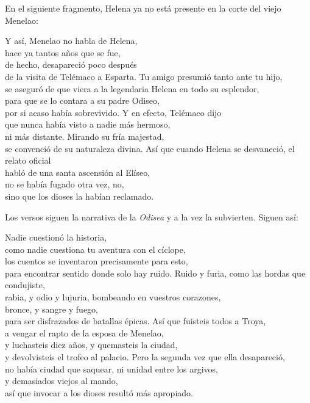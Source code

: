 En el siguiente fragmento, Helena ya no está presente en la corte del viejo Menelao:

\begin{versopropio}
Y así, Menelao no habla de Helena,\\
hace ya tantos años que se fue,\\
de hecho, desapareció poco después\\
de la visita de Telémaco a Esparta.
\stanzabreak
Tu amigo presumió tanto ante tu hijo,\\
se aseguró de que viera a la legendaria Helena en todo su esplendor,\\
para que se lo contara a su padre Odiseo,\\
por si acaso había sobrevivido.
\stanzabreak
Y en efecto, Telémaco dijo\\
que nunca había visto a nadie más hermoso,\\
ni más distante. Mirando su fría majestad,\\
se convenció de su naturaleza divina.
\stanzabreak
Así que cuando Helena se desvaneció, el relato oficial\\
habló de una santa ascensión al Elíseo,\\
no se había fugado otra vez, no,\\
sino que los dioses la habían reclamado.
\end{versopropio}

Los versos siguen la narrativa de la \emph{Odisea} y a la vez la subvierten. Siguen así:

\begin{versopropio}
Nadie cuestionó la historia,\\
como nadie cuestiona tu aventura con el cíclope,\\
los cuentos se inventaron precisamente para esto,\\
para encontrar sentido donde solo hay ruido.
\stanzabreak
Ruido y furia, como las hordas que condujiste,\\
rabia, y odio y lujuria, bombeando en vuestros corazones,\\
bronce, y sangre y fuego,\\
para ser disfrazados de batallas épicas.
\stanzabreak
Así que fuisteis todos a Troya,\\
a vengar el rapto de la esposa de Menelao,\\
y luchasteis diez años, y quemasteis la ciudad,\\
y devolvisteis el trofeo al palacio.
\stanzabreak
Pero la segunda vez que ella desapareció,\\
no había ciudad que saquear, ni unidad entre los argivos,\\
y demasiados viejos al mando,\\
así que invocar a los dioses resultó más apropiado.
\end{versopropio}

